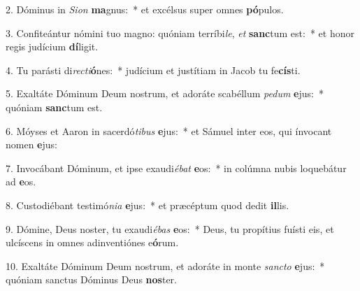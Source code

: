 2. Dóminus in \textit{Si}\textit{on} \textbf{ma}gnus:~*  et excélsus super omnes \textbf{pó}pulos.\

3. Confiteántur nómini tuo magno: quóniam terríbi\textit{le}, \textit{et} \textbf{sanc}tum est:~*  et honor regis judícium \textbf{dí}ligit.\

4. Tu parásti di\textit{rec}\textit{ti}\textbf{ó}nes:~*  judícium et justítiam in Jacob tu fe\textbf{cís}ti.\

5. Exaltáte Dóminum Deum nostrum, et adoráte scabéllum \textit{pe}\textit{dum} \textbf{e}jus:~*  quóniam \textbf{sanc}tum est.\

6. Móyses et Aaron in sacerdó\textit{ti}\textit{bus} \textbf{e}jus:~*  et Sámuel inter eos, qui ínvocant nomen \textbf{e}jus:\

7. Invocábant Dóminum, et ipse exaudi\textit{é}\textit{bat} \textbf{e}os:~*  in colúmna nubis loquebátur ad \textbf{e}os.\

8. Custodiébant testimó\textit{ni}\textit{a} \textbf{e}jus:~*  et præcéptum quod dedit \textbf{il}lis.\

9. Dómine, Deus noster, tu exaudi\textit{é}\textit{bas} \textbf{e}os:~*  Deus, tu propítius fuísti eis, et ulcíscens in omnes adinventiónes e\textbf{ó}rum.\

10. Exaltáte Dóminum Deum nostrum, et adoráte in monte \textit{sanc}\textit{to} \textbf{e}jus:~*  quóniam sanctus Dóminus Deus \textbf{nos}ter.\

